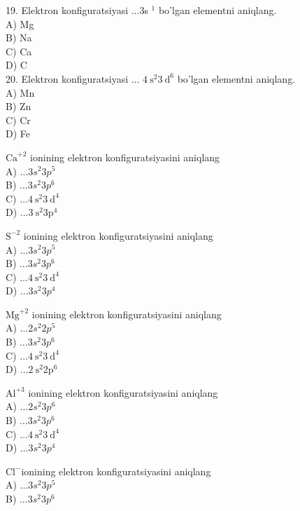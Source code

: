 19. Elektron konfiguratsiyasi ...3s ${ }^{1}$ bo'lgan elementni aniqlang.\\
A) Mg\\
B) Na\\
C) Ca\\
D) C\\
20. Elektron konfiguratsiyasi ... $4 \mathrm{~s}^{2} 3 \mathrm{~d}^{6}$ bo'lgan elementni aniqlang.\\
A) Mn\\
B) Zn\\
C) Cr\\
D) Fe
  \item $\mathrm{Ca}^{+2}$ ionining elektron konfiguratsiyasini aniqlang\\
A) $\ldots 3 s^{2} 3 p^{5}$\\
B) $\ldots 3 s^{2} 3 p^{6}$\\
C) $\ldots 4 \mathrm{~s}^{2} 3 \mathrm{~d}^{4}$\\
D) $\ldots 3 \mathrm{~s}^{2} 3 \mathrm{p}^{4}$\\
  \item $\mathrm{S}^{-2}$ ionining elektron konfiguratsiyasini aniqlang\\
A) $\ldots 3 s^{2} 3 p^{5}$\\
B) $\ldots 3 s^{2} 3 p^{6}$\\
C) $\ldots 4 \mathrm{~s}^{2} 3 \mathrm{~d}^{4}$\\
D) $\ldots 3 s^{2} 3 p{ }^{4}$
  \item $\mathrm{Mg}^{+2}$ ionining elektron konfiguratsiyasini aniqlang\\
A) $\ldots 2 s^{2} 2 p^{5}$\\
B) $\ldots 3 s^{2} 3 p^{6}$\\
C) $\ldots 4 \mathrm{~s}^{2} 3 \mathrm{~d}^{4}$\\
D) $\ldots 2 \mathrm{~s}^{2} 2 \mathrm{p}^{6}$
  \item $\mathrm{Al}^{+3}$ ionining elektron konfiguratsiyasini aniqlang\\
A) $\ldots 2 s^{2} 3 p^{6}$\\
B) $\ldots 3 s^{2} 3 p^{6}$\\
C) $\ldots 4 \mathrm{~s}^{2} 3 \mathrm{~d}^{4}$\\
D) $\ldots 3 s^{2} 3 p{ }^{4}$
  \item $\mathrm{Cl}^{-}$ionining elektron konfiguratsiyasini aniqlang\\
A) $\ldots 3 s^{2} 3 p^{5}$\\
B) $\ldots 3 s^{2} 3 p^{6}$\\
